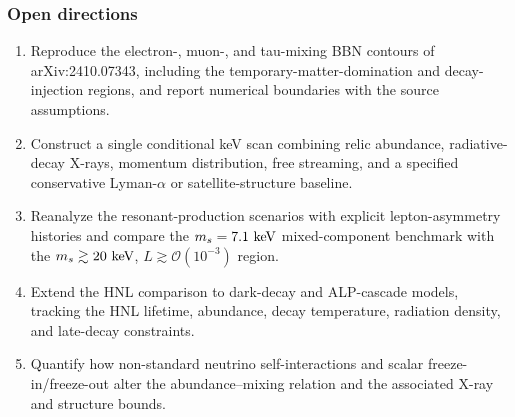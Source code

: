 \documentclass[11pt,a4paper]{article}
\begin{document}
\subsubsection*{Open directions}
\begin{enumerate}
  \item Reproduce the electron-, muon-, and tau-mixing BBN contours of arXiv:2410.07343, including the temporary-matter-domination and decay-injection regions, and report numerical boundaries with the source assumptions.
  \item Construct a single conditional keV scan combining relic abundance, radiative-decay X-rays, momentum distribution, free streaming, and a specified conservative Lyman-\(\alpha\) or satellite-structure baseline.
  \item Reanalyze the resonant-production scenarios with explicit lepton-asymmetry histories and compare the \(m_s=7.1\ {\rm keV}\) mixed-component benchmark with the \(m_s\gtrsim20\ {\rm keV}\), \(L\gtrsim\mathcal{O}(10^{-3})\) region.
  \item Extend the HNL comparison to dark-decay and ALP-cascade models, tracking the HNL lifetime, abundance, decay temperature, radiation density, and late-decay constraints.
  \item Quantify how non-standard neutrino self-interactions and scalar freeze-in/freeze-out alter the abundance--mixing relation and the associated X-ray and structure bounds.
\end{enumerate}
\end{document}

